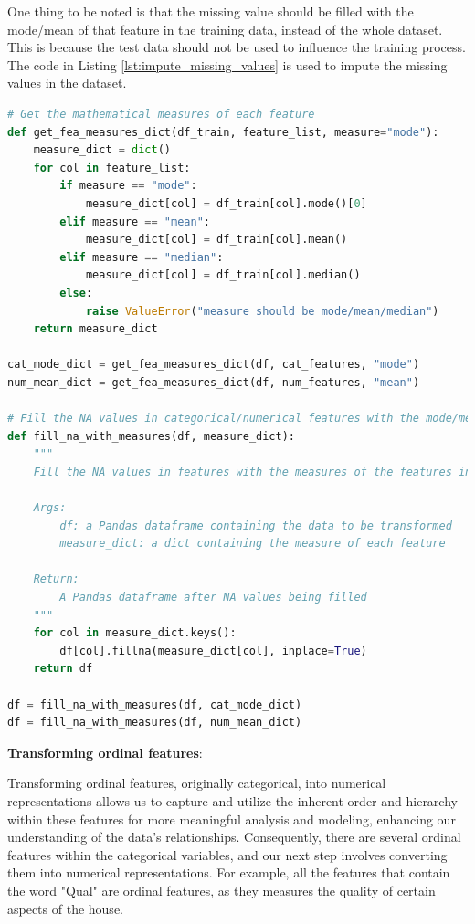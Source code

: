 \documentclass[10pt]{article}
\begin{document}
One thing to be noted is that the missing value should be filled with the mode/mean of that feature in the training data, instead of the whole dataset. This is because the test data should not be used to influence the training process. The code in Listing \ref{lst:impute_missing_values} is used to impute the missing values in the dataset.

\begin{lstlisting}[language=Python, label={lst:impute_missing_values}, caption={Fill the missing values with the measures of the feature in the training data}]
# Get the mathematical measures of each feature
def get_fea_measures_dict(df_train, feature_list, measure="mode"):
    measure_dict = dict()
    for col in feature_list:
        if measure == "mode":
            measure_dict[col] = df_train[col].mode()[0]
        elif measure == "mean":
            measure_dict[col] = df_train[col].mean()
        elif measure == "median":
            measure_dict[col] = df_train[col].median()
        else:
            raise ValueError("measure should be mode/mean/median")
    return measure_dict

cat_mode_dict = get_fea_measures_dict(df, cat_features, "mode")
num_mean_dict = get_fea_measures_dict(df, num_features, "mean")

# Fill the NA values in categorical/numerical features with the mode/mean of the features in the training dataset
def fill_na_with_measures(df, measure_dict):
    """
    Fill the NA values in features with the measures of the features in the training dataset

    Args:
        df: a Pandas dataframe containing the data to be transformed
        measure_dict: a dict containing the measure of each feature

    Return:
        A Pandas dataframe after NA values being filled
    """
    for col in measure_dict.keys():
        df[col].fillna(measure_dict[col], inplace=True)
    return df

df = fill_na_with_measures(df, cat_mode_dict)
df = fill_na_with_measures(df, num_mean_dict)
\end{lstlisting}

\textbf{Transforming ordinal features}:

Transforming ordinal features, originally categorical, into numerical representations allows us to capture and utilize the inherent order and hierarchy within these features for more meaningful analysis and modeling, enhancing our understanding of the data's relationships. Consequently, there are several ordinal features within the categorical variables, and our next step involves converting them into numerical representations. For example, all the features that contain the word "Qual" are ordinal features, as they measures the quality of certain aspects of the house. 
\end{document}
